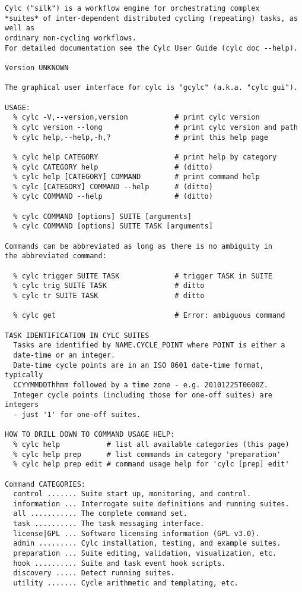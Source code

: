 \label{help}
\begin{lstlisting}
Cylc ("silk") is a workflow engine for orchestrating complex
*suites* of inter-dependent distributed cycling (repeating) tasks, as well as
ordinary non-cycling workflows.
For detailed documentation see the Cylc User Guide (cylc doc --help).

Version UNKNOWN

The graphical user interface for cylc is "gcylc" (a.k.a. "cylc gui").

USAGE:
  % cylc -V,--version,version           # print cylc version
  % cylc version --long                 # print cylc version and path
  % cylc help,--help,-h,?               # print this help page

  % cylc help CATEGORY                  # print help by category
  % cylc CATEGORY help                  # (ditto)
  % cylc help [CATEGORY] COMMAND        # print command help
  % cylc [CATEGORY] COMMAND --help      # (ditto)
  % cylc COMMAND --help                 # (ditto)

  % cylc COMMAND [options] SUITE [arguments]
  % cylc COMMAND [options] SUITE TASK [arguments]

Commands can be abbreviated as long as there is no ambiguity in
the abbreviated command:

  % cylc trigger SUITE TASK             # trigger TASK in SUITE
  % cylc trig SUITE TASK                # ditto
  % cylc tr SUITE TASK                  # ditto

  % cylc get                            # Error: ambiguous command

TASK IDENTIFICATION IN CYLC SUITES
  Tasks are identified by NAME.CYCLE_POINT where POINT is either a
  date-time or an integer.
  Date-time cycle points are in an ISO 8601 date-time format, typically
  CCYYMMDDThhmm followed by a time zone - e.g. 20101225T0600Z.
  Integer cycle points (including those for one-off suites) are integers
  - just '1' for one-off suites.

HOW TO DRILL DOWN TO COMMAND USAGE HELP:
  % cylc help           # list all available categories (this page)
  % cylc help prep      # list commands in category 'preparation'
  % cylc help prep edit # command usage help for 'cylc [prep] edit'

Command CATEGORIES:
  control ....... Suite start up, monitoring, and control.
  information ... Interrogate suite definitions and running suites.
  all ........... The complete command set.
  task .......... The task messaging interface.
  license|GPL ... Software licensing information (GPL v3.0).
  admin ......... Cylc installation, testing, and example suites.
  preparation ... Suite editing, validation, visualization, etc.
  hook .......... Suite and task event hook scripts.
  discovery ..... Detect running suites.
  utility ....... Cycle arithmetic and templating, etc.
\end{lstlisting}

